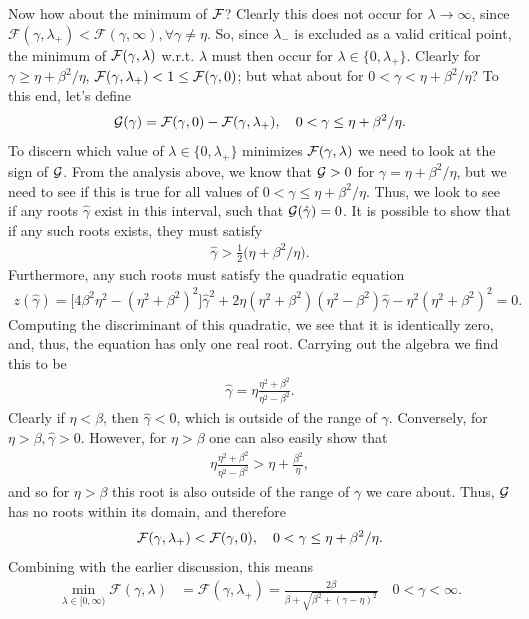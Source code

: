 \documentclass[a4paper,10pt]{article}
\begin{document}
Now how about the minimum of ${\cal F}$? Clearly this does not occur for $\lambda \to \infty$, since $\mathcal{F}(\gamma,\lambda_+) < \mathcal{F}(\gamma,\infty), \forall \gamma \neq \eta$. So, since $\lambda_-$ is excluded as a valid critical point, the minimum of ${\cal F}(\gamma,\lambda)$ w.r.t. $\lambda$ must then occur for $\lambda \in \{0, \lambda_+\}$. Clearly for $\gamma \geq \eta + \beta^2 / \eta$, ${\cal F}(\gamma, \lambda_+) < 1 \leq {\cal F}(\gamma, 0)$; but what about for $0 < \gamma < \eta + \beta^2 / \eta$?
To this end, let's define
\begin{align*}
{\cal G}(\gamma) = \mathcal{F}(\gamma,0) -  \mathcal{F}(\gamma,\lambda_+), \quad 0 < \gamma \leq \eta + \beta^2 / \eta.
\end{align*}
To discern which value of ${\lambda} \in \{0, \lambda_+ \}$ minimizes ${\cal F}(\gamma, \lambda)$ we need to look at the sign of ${\cal G}$. From the analysis above, we know that ${\cal G} > 0$ for $\gamma = \eta + \beta^2/\eta$, but we need to see if this is true for all values of $0 < \gamma \leq \eta + \beta^2/\eta$. Thus, we look to see if any roots $\hat{\gamma}$ exist in this interval, such that ${\cal G}(\hat{\gamma}) = 0$. 
%
It is possible to show that if  any such roots exists, they must satisfy
\begin{align*}
\hat{\gamma} > \tfrac{1}{2} \big( \eta + \beta^2 / \eta).
\end{align*}
Furthermore, any such roots must satisfy the quadratic equation
\begin{align*}
z(\hat{\gamma}) = \big[ 4 \beta^2 \eta^2 - (\eta^2 + \beta^2)^2 \big] \hat{\gamma}^2 + 2 \eta (\eta^2 + \beta^2)(\eta^2 - \beta^2) \hat{\gamma} - \eta^2(\eta^2 + \beta^2)^2 = 0.
\end{align*}
Computing the discriminant of this quadratic, we see that it is identically zero, and, thus, the equation has only one real root. Carrying out the algebra we find this to be
\begin{align} \label{eq:gamma_hat}
\hat{\gamma} = \eta \frac{\eta^2 + \beta^2}{\eta^2 - \beta^2}. 
\end{align}
Clearly if $\eta < \beta$, then $\hat{\gamma} < 0$, which is outside of the range of $\gamma$. Conversely, for $\eta > \beta, \hat{\gamma} > 0$. However, for $\eta > \beta$ one can also easily show that
\begin{align*}
\eta \frac{\eta^2 + \beta^2}{\eta^2 - \beta^2} > \eta + \frac{\beta^2}{\eta},
\end{align*}
and so for $\eta > \beta$ this root is also outside of the range of $\gamma$ we care about.
Thus, ${\cal G}$ has no roots within its domain, and therefore
\begin{align*}
{\cal F} (\gamma, \lambda_+) < {\cal F}(\gamma, 0), \quad 0 < \gamma \leq \eta + \beta^2/\eta.
\end{align*}
Combining with the earlier discussion, this means
\begin{align*}
\min_{\lambda\in[0,\infty)} \mathcal{F}(\gamma,\lambda) &=  \mathcal{F}(\gamma,\lambda_+) = \frac{2\beta}{\beta + \sqrt{\beta^2 + (\gamma-\eta)^2}} \quad 0 < \gamma < \infty.
\end{align*}
\end{document}
